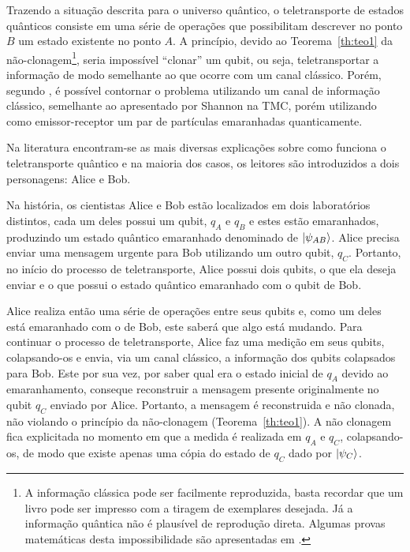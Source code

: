 \documentclass[12pt,oneside,brazil,hidelinks,article,sumario=tradicional,a4paper]{abntex2}
\begin{document}
Trazendo a situação descrita para o universo quântico, o teletransporte de estados quânticos consiste em uma série de operações que possibilitam descrever no ponto \(B\) um estado existente no ponto \(A\). A princípio, devido ao Teorema~\ref{th:teo1} da não-clonagem\footnote{A informação clássica pode ser facilmente reproduzida, basta recordar que um livro pode ser impresso com a tiragem de exemplares desejada. Já a informação quântica não é plausível de reprodução direta. Algumas provas matemáticas desta impossibilidade são apresentadas em \textcite{TeoQuanInfoEntreCopia}.}, seria impossível ``clonar'' um qubit, ou seja, teletransportar a informação de modo semelhante ao que ocorre com um canal clássico. Porém, segundo \textcite{bennet}, é possível contornar o problema utilizando um canal de informação clássico, semelhante ao apresentado por Shannon na TMC, porém utilizando como emissor-receptor um par de partículas emaranhadas quanticamente.

Na literatura encontram-se as mais diversas explicações sobre como funciona o teletransporte quântico \cites{bennet}{experimentalqt}{zeilinger}{brassard1996teleportation}{materialdidaticomecquantica} e na maioria dos casos, os leitores são introduzidos a dois personagens: Alice e Bob.

Na história, os cientistas Alice e Bob estão localizados em dois laboratórios distintos, cada um deles possui um qubit, $q_{A}$ e $q_{B}$ e estes estão emaranhados, produzindo um estado quântico emaranhado denominado de $\ket{\psi_{AB}}$. Alice precisa enviar uma mensagem urgente para Bob utilizando um outro qubit, $q_{C}$. Portanto, no início do processo de teletransporte, Alice possui dois qubits, o que ela deseja enviar e o que possui o estado quântico emaranhado com o qubit de Bob.

Alice realiza então uma série de operações entre seus qubits e, como um deles está emaranhado com o de Bob, este saberá que algo está mudando. Para continuar o processo de teletransporte, Alice faz uma medição em seus qubits, colapsando-os e envia, via um canal clássico, a informação dos qubits colapsados para Bob. Este por sua vez, por saber qual era o estado inicial de $q_{A}$ devido ao emaranhamento, conseque reconstruir a mensagem presente originalmente no qubit $q_{C}$ enviado por Alice. Portanto, a mensagem é reconstruida e não clonada, não violando o princípio da não-clonagem (Teorema~\ref{th:teo1}). A não clonagem fica explicitada no momento em que a medida é realizada em $q_{A}$ e $q_{C}$, colapsando-os, de modo que existe apenas uma cópia do estado de $q_{C}$ dado por $\ket{\psi_{C}}$.
\end{document}
